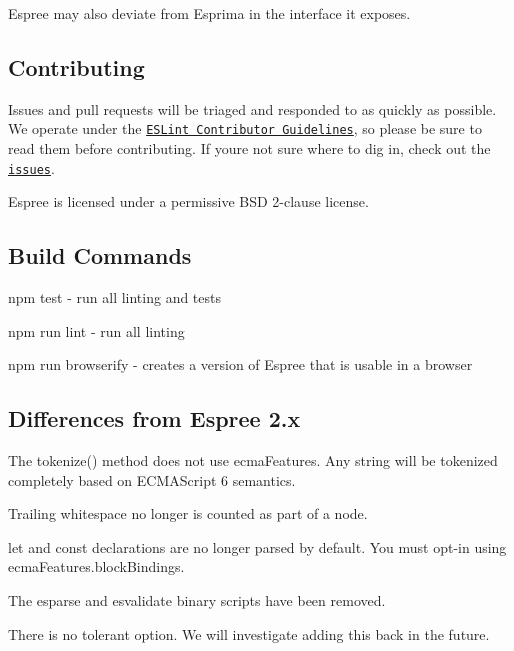 Espree may also deviate from Esprima in the interface it exposes.

\subsection*{Contributing}

Issues and pull requests will be triaged and responded to as quickly as possible. We operate under the \href{http://eslint.org/docs/developer-guide/contributing}{\tt E\+S\+Lint Contributor Guidelines}, so please be sure to read them before contributing. If you\textquotesingle{}re not sure where to dig in, check out the \href{https://github.com/eslint/espree/issues}{\tt issues}.

Espree is licensed under a permissive B\+SD 2-\/clause license.

\subsection*{Build Commands}


\begin{DoxyItemize}
\item {\ttfamily npm test} -\/ run all linting and tests
\item {\ttfamily npm run lint} -\/ run all linting
\item {\ttfamily npm run browserify} -\/ creates a version of Espree that is usable in a browser
\end{DoxyItemize}

\subsection*{Differences from Espree 2.\+x}


\begin{DoxyItemize}
\item The {\ttfamily tokenize()} method does not use {\ttfamily ecma\+Features}. Any string will be tokenized completely based on E\+C\+M\+A\+Script 6 semantics.
\item Trailing whitespace no longer is counted as part of a node.
\item {\ttfamily let} and {\ttfamily const} declarations are no longer parsed by default. You must opt-\/in using {\ttfamily ecma\+Features.\+block\+Bindings}.
\item The {\ttfamily esparse} and {\ttfamily esvalidate} binary scripts have been removed.
\item There is no {\ttfamily tolerant} option. We will investigate adding this back in the future.
\end{DoxyItemize}

